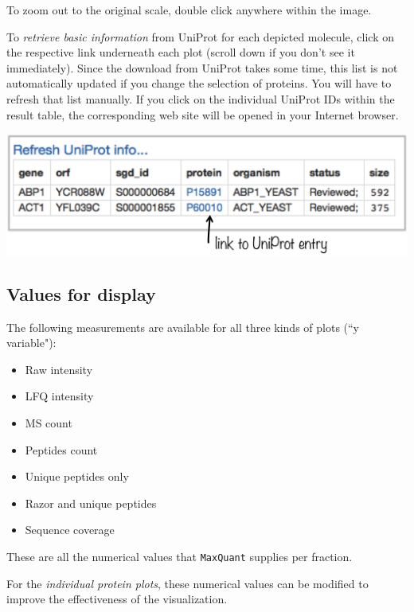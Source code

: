\documentclass[letterpaper, twocolumn, 9pt]{article}
\begin{document}
To zoom out to the original scale, double click anywhere within the image.

To \textit{retrieve basic information} from UniProt for each depicted molecule, click on the respective link underneath each plot (scroll down if you don't see it immediately).
Since the download from UniProt takes some time, this list is not automatically updated if you change the selection of proteins.
You will have to refresh that list manually.
If you click on the individual UniProt IDs within the result table, the corresponding web site will be opened in your Internet browser.

\includegraphics[scale=.4]{figures/ss_uniProtInfo01.png}

\subsection{Values for display}

The following measurements are available for all three kinds of plots (\textsf{``y variable"}):

\begin{itemize}[noitemsep]
\item Raw intensity
\item LFQ intensity
\item MS count
\item Peptides count %
\item Unique peptides only
\item Razor and unique peptides %
\item Sequence coverage %
\end{itemize}

These are all the numerical values that \texttt{MaxQuant} supplies per fraction.

For the \emph{individual protein plots}, these numerical values can be modified to improve the effectiveness of the visualization.
\end{document}
